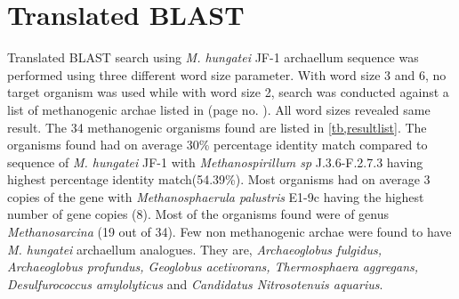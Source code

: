 \documentclass[fontsize=12pt,headsepline=true, bibliography=totocnumbered, twoside]{scrbook} %
\begin{document}
\section{Translated BLAST}
Translated BLAST search using \textit{M. hungatei} JF-1 archaellum sequence was performed using three different word size parameter. With word size 3 and 6, no target organism was used while with word size 2, search was conducted against a list of methanogenic archae listed in  (page no. \pageref{appendix}). All word sizes revealed same result. The 34 methanogenic organisms found are listed in \autoref{tb,resultlist}. The organisms found had on average 30\% percentage identity match compared to sequence of \textit{M. hungatei} JF-1 with \textit{Methanospirillum sp} J.3.6-F.2.7.3 having highest percentage identity match(54.39\%). Most organisms had on average 3 copies of the gene with \textit{ Methanosphaerula palustris} E1-9c having the highest number of gene copies (8). Most of the organisms found were of genus \textit{Methanosarcina} (19 out of 34). Few non methanogenic archae were found to have \textit{M. hungatei} archaellum analogues. They are, \textit{Archaeoglobus fulgidus, Archaeoglobus profundus, Geoglobus acetivorans, Thermosphaera aggregans, Desulfurococcus amylolyticus} and \textit{Candidatus Nitrosotenuis aquarius}.
\end{document}
